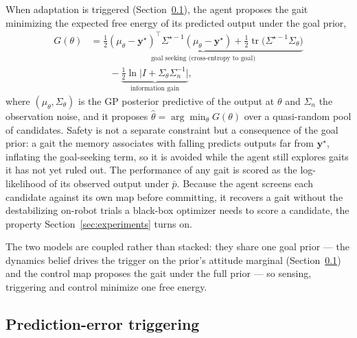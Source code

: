 \documentclass[letterpaper, 10 pt, conference]{ieeeconf}  %
\DeclareMathOperator{\tr}{tr}
\begin{document}
When adaptation is triggered (Section~\ref{sec:trigger}), the agent proposes the gait minimizing the expected free energy of its predicted output under the goal prior,
\begin{align} \label{eq:EFE}
    G(\theta) &= \underbrace{\tfrac{1}{2}(\mu_\theta - \mathbf{y}^{\star})^{\!\top} \Sigma^{\star-1}(\mu_\theta - \mathbf{y}^{\star}) + \tfrac{1}{2}\tr\!\big(\Sigma^{\star-1}\Sigma_\theta\big)}_{\text{goal seeking (cross-entropy to goal)}} \nonumber \\
    & \qquad - \underbrace{\tfrac{1}{2}\ln\!\big|I + \Sigma_\theta \Sigma_n^{-1}\big|}_{\text{information gain}} ,
\end{align}
where $(\mu_\theta, \Sigma_\theta)$ is the GP posterior predictive of the output at $\theta$ and $\Sigma_n$ the observation noise, and it proposes $\hat{\theta} = \arg\min_\theta G(\theta)$ over a quasi-random pool of candidates. Safety is not a separate constraint but a consequence of the goal prior: a gait the memory associates with falling predicts outputs far from $\mathbf{y}^{\star}$, inflating the goal-seeking term, so it is avoided while the agent still explores gaits it has not yet ruled out. The performance of any gait is scored as the log-likelihood of its observed output under $\bar{p}$. Because the agent screens each candidate against its own map before committing, it recovers a gait without the destabilizing on-robot trials a black-box optimizer needs to score a candidate, the property Section~\ref{sec:experiments} turns on.

The two models are coupled rather than stacked: they share one goal prior --- the dynamics belief drives the trigger on the prior's attitude marginal (Section~\ref{sec:trigger}) and the control map proposes the gait under the full prior --- so sensing, triggering and control minimize one free energy.

\subsection{Prediction-error triggering}
\label{sec:trigger}
\end{document}
